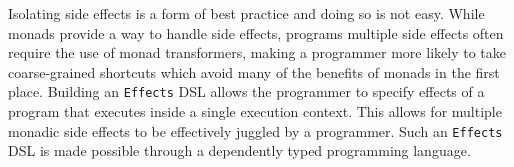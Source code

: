 Isolating side effects is a form of best practice and doing so is not easy.
While monads provide a way to handle side effects, programs multiple side
effects often require the use of monad transformers, making a programmer more
likely to take coarse-grained shortcuts which avoid many of the benefits of
monads in the first place. Building an \texttt{Effects} DSL allows the
programmer to specify effects of a program that executes inside a single
execution context. This allows for multiple monadic side effects to be
effectively juggled by a programmer. Such an \texttt{Effects} DSL is made
possible through a dependently typed programming language.